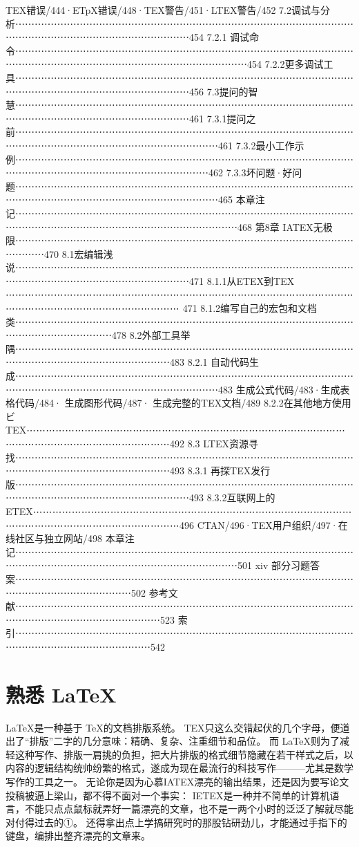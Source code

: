 \documentclass[UTF8]{ctexart}
\begin{document}
TEX错误/444·ETpX错误/448·TEX警告/451·LTEX警告/452
7.2调试与分析⋯⋯⋯⋯⋯⋯⋯⋯⋯⋯⋯⋯⋯⋯⋯⋯⋯⋯⋯⋯⋯⋯⋯⋯⋯⋯⋯⋯⋯⋯⋯⋯⋯⋯⋯⋯⋯⋯⋯⋯⋯⋯⋯⋯⋯⋯⋯⋯⋯⋯⋯⋯⋯⋯454
7.2.1 调试命令⋯⋯⋯⋯⋯⋯⋯⋯⋯⋯⋯⋯⋯⋯⋯⋯⋯⋯⋯⋯⋯⋯⋯⋯⋯⋯⋯⋯⋯⋯⋯⋯⋯⋯⋯⋯⋯⋯⋯⋯⋯⋯⋯⋯⋯⋯⋯⋯⋯⋯⋯⋯⋯⋯⋯⋯⋯⋯⋯⋯454
7.2.2更多调试工具⋯⋯⋯⋯⋯⋯⋯⋯⋯⋯⋯⋯⋯⋯⋯⋯⋯⋯⋯⋯⋯⋯⋯⋯⋯⋯⋯⋯⋯⋯⋯⋯⋯⋯⋯⋯⋯⋯⋯⋯⋯⋯⋯⋯⋯⋯⋯⋯⋯⋯⋯⋯⋯⋯456
7.3提问的智慧⋯⋯⋯⋯⋯⋯⋯⋯⋯⋯⋯⋯⋯⋯⋯⋯⋯⋯⋯⋯⋯⋯⋯⋯⋯⋯⋯⋯⋯⋯⋯⋯⋯⋯⋯⋯⋯⋯⋯⋯⋯⋯⋯⋯⋯⋯⋯⋯⋯⋯⋯⋯⋯⋯461
7.3.1提问之前⋯⋯⋯⋯⋯⋯⋯⋯⋯⋯⋯⋯⋯⋯⋯⋯⋯⋯⋯⋯⋯⋯⋯⋯⋯⋯⋯⋯⋯⋯⋯⋯⋯⋯⋯⋯⋯⋯⋯⋯⋯⋯⋯⋯⋯⋯⋯⋯⋯⋯⋯⋯⋯⋯⋯⋯⋯461
7.3.2最小工作示例⋯⋯⋯⋯⋯⋯⋯⋯⋯⋯⋯⋯⋯⋯⋯⋯⋯⋯⋯⋯⋯⋯⋯⋯⋯⋯⋯⋯⋯⋯⋯⋯⋯⋯⋯⋯⋯⋯⋯⋯⋯⋯⋯⋯⋯⋯⋯⋯⋯⋯⋯⋯⋯⋯⋯⋯462
7.3.3坏问题·好问题⋯⋯⋯⋯⋯⋯⋯⋯⋯⋯⋯⋯⋯⋯⋯⋯⋯⋯⋯⋯⋯⋯⋯⋯⋯⋯⋯⋯⋯⋯⋯⋯⋯⋯⋯⋯⋯⋯⋯⋯⋯⋯⋯⋯⋯⋯⋯⋯⋯⋯⋯⋯⋯⋯⋯⋯⋯465
本章注记⋯⋯⋯⋯⋯⋯⋯⋯⋯⋯⋯⋯⋯⋯⋯⋯⋯⋯⋯⋯⋯⋯⋯⋯⋯⋯⋯⋯⋯⋯⋯⋯⋯⋯⋯⋯⋯⋯⋯⋯⋯⋯⋯⋯⋯⋯⋯⋯⋯⋯⋯⋯⋯⋯⋯⋯⋯⋯⋯468
第8章 IATEX无极限⋯⋯⋯⋯⋯⋯⋯⋯⋯⋯⋯⋯⋯⋯⋯⋯⋯⋯⋯⋯⋯⋯⋯⋯⋯⋯⋯⋯⋯⋯⋯⋯⋯⋯⋯⋯⋯⋯⋯470
8.1宏编辑浅说⋯⋯⋯⋯⋯⋯⋯⋯⋯⋯⋯⋯⋯⋯⋯⋯⋯⋯⋯⋯⋯⋯⋯⋯⋯⋯⋯⋯⋯⋯⋯⋯⋯⋯⋯⋯⋯⋯⋯⋯⋯⋯⋯⋯⋯⋯⋯⋯⋯⋯⋯⋯⋯⋯471
8.1.1从ETEX到TEX ⋯⋯⋯⋯⋯⋯⋯⋯⋯⋯⋯⋯⋯⋯⋯⋯⋯⋯⋯⋯⋯⋯⋯⋯⋯⋯⋯⋯⋯⋯⋯⋯⋯⋯⋯⋯⋯⋯⋯⋯⋯⋯⋯⋯⋯⋯⋯⋯⋯⋯⋯⋯⋯⋯ 471
8.1.2编写自己的宏包和文档类⋯⋯⋯⋯⋯⋯⋯⋯⋯⋯⋯⋯⋯⋯⋯⋯⋯⋯⋯⋯⋯⋯⋯⋯⋯⋯⋯⋯⋯⋯⋯⋯⋯⋯⋯⋯⋯⋯⋯⋯⋯⋯⋯⋯⋯⋯478
8.2外部工具举隅⋯⋯⋯⋯⋯⋯⋯⋯⋯⋯⋯⋯⋯⋯⋯⋯⋯⋯⋯⋯⋯⋯⋯⋯⋯⋯⋯⋯⋯⋯⋯⋯⋯⋯⋯⋯⋯⋯⋯⋯⋯⋯⋯⋯⋯⋯⋯⋯⋯⋯⋯⋯483
8.2.1 自动代码生成⋯⋯⋯⋯⋯⋯⋯⋯⋯⋯⋯⋯⋯⋯⋯⋯⋯⋯⋯⋯⋯⋯⋯⋯⋯⋯⋯⋯⋯⋯⋯⋯⋯⋯⋯⋯⋯⋯⋯⋯⋯⋯⋯⋯⋯⋯⋯⋯⋯⋯⋯⋯⋯⋯⋯⋯⋯483
生成公式代码/483·生成表格代码/484·  生成图形代码/487·  生成完整的TEX文档/489
8.2.2在其他地方使用ビTEX⋯⋯⋯⋯⋯⋯⋯⋯⋯⋯⋯⋯⋯⋯⋯⋯⋯⋯⋯⋯⋯⋯⋯⋯⋯⋯⋯⋯⋯⋯⋯⋯⋯⋯⋯⋯⋯⋯⋯⋯⋯⋯⋯⋯⋯⋯⋯⋯⋯⋯492
8.3 LTEX资源寻找⋯⋯⋯⋯⋯⋯⋯⋯⋯⋯⋯⋯⋯⋯⋯⋯⋯⋯⋯⋯⋯⋯⋯⋯⋯⋯⋯⋯⋯⋯⋯⋯⋯⋯⋯⋯⋯⋯⋯⋯⋯⋯⋯⋯⋯⋯⋯⋯⋯⋯⋯⋯493
8.3.1 再探TEX发行版⋯⋯⋯⋯⋯⋯⋯⋯⋯⋯⋯⋯⋯⋯⋯⋯⋯⋯⋯⋯⋯⋯⋯⋯⋯⋯⋯⋯⋯⋯⋯⋯⋯⋯⋯⋯⋯⋯⋯⋯⋯⋯⋯⋯⋯⋯⋯⋯⋯⋯⋯⋯⋯⋯493
8.3.2互联网上的ETEX⋯⋯⋯⋯⋯⋯⋯⋯⋯⋯⋯⋯⋯⋯⋯⋯⋯⋯⋯⋯⋯⋯⋯⋯⋯⋯⋯⋯⋯⋯⋯⋯⋯⋯⋯⋯⋯⋯⋯⋯⋯⋯⋯⋯⋯⋯⋯⋯⋯⋯⋯496
CTAN/496·TEX用户组织/497·在线社区与独立网站/498
本章注记⋯⋯⋯⋯⋯⋯⋯⋯⋯⋯⋯⋯⋯⋯⋯⋯⋯⋯⋯⋯⋯⋯⋯⋯⋯⋯⋯⋯⋯⋯⋯⋯⋯⋯⋯⋯⋯⋯⋯⋯⋯⋯⋯⋯⋯⋯⋯⋯⋯⋯⋯⋯⋯⋯⋯⋯⋯⋯⋯501
xiv
部分习题答案⋯⋯⋯⋯⋯⋯⋯⋯⋯⋯⋯⋯⋯⋯⋯⋯⋯⋯⋯⋯⋯⋯⋯⋯⋯⋯⋯⋯⋯⋯⋯⋯⋯⋯⋯⋯⋯⋯⋯⋯⋯⋯⋯⋯⋯⋯⋯⋯502
参考文献⋯⋯⋯⋯⋯⋯⋯⋯⋯⋯⋯⋯⋯⋯⋯⋯⋯⋯⋯⋯⋯⋯⋯⋯⋯⋯⋯⋯⋯⋯⋯⋯⋯⋯⋯⋯⋯⋯⋯⋯⋯⋯⋯⋯⋯⋯⋯⋯⋯⋯⋯523
索引⋯⋯⋯⋯⋯⋯⋯⋯⋯⋯⋯⋯⋯⋯⋯⋯⋯⋯⋯⋯⋯⋯⋯⋯⋯⋯⋯⋯⋯⋯⋯⋯⋯⋯⋯⋯⋯⋯⋯⋯⋯⋯⋯⋯⋯⋯⋯⋯⋯⋯542

\section{熟悉 LaTeX}
\label{sec:熟悉LaTeX}

\LaTeX 是一种基于 \TeX 的文档排版系统。
TEX只这么交错起伏的几个字母，便道出了“排版”二字的几分意味：精确、复杂、注重细节和品位。
而 \LaTeX 则为了减轻这种写作、排版一肩挑的负担，把大片排版的格式细节隐藏在若干样式之后，以内容的逻辑结构统帅纷繁的格式，遂成为现在最流行的科技写作———尤其是数学写作的工具之一。
无论你是因为心慕IATEX漂亮的输出结果，还是因为要写论文投稿被逼上梁山，都不得不面对一个事实：
IETEX是一种并不简单的计算机语言，不能只点点鼠标就弄好一篇漂亮的文章，也不是一两个小时的泛泛了解就尽能对付得过去的①。
还得拿出点上学搞研究时的那股钻研劲儿，才能通过手指下的键盘，编排出整齐漂亮的文章来。
\end{document}

